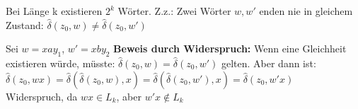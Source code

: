 \documentclass[a4paper,10pt,landscape]{article}
\begin{document}
\begin{multicols}{3}
Bei Länge k existieren $2^k$ Wörter. Z.z.: Zwei Wörter $w, w'$ enden nie in gleichem Zustand: $\hat{\delta}(z_0, w) \neq \hat{\delta}(z_0, w')$

Sei $w=xay_1$, $w'=xby_2$
\textbf{Beweis durch Widerspruch:} Wenn eine Gleichheit existieren würde, müsste:
$\hat{\delta}(z_0, w)= \hat{\delta}(z_0, w')$ gelten.
Aber dann ist:
$\hat{\delta}(z_0, wx) = \hat{\delta}(\hat{\delta}(z_0, w), x)
    = \hat{\delta}(\hat{\delta}(z_0, w'), x) = \hat{\delta}(z_0, w'x)$\\
Widerspruch, da $ wx\in L_k $, aber $w'x\not\in L_k$

\vfill\null    %
\columnbreak

\end{multicols}
\end{document}
